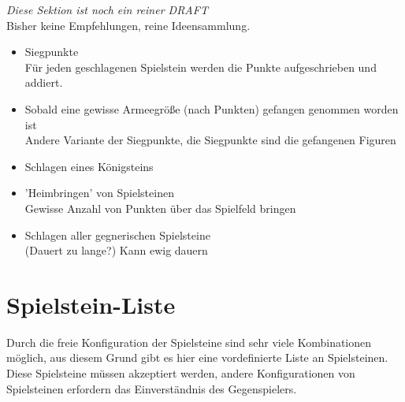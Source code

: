\documentclass{article}
\begin{document}
	\textit{Diese Sektion ist noch ein reiner DRAFT} \\
	Bisher keine Empfehlungen, reine Ideensammlung.
	
	\begin{itemize}
	\item Siegpunkte \\
		  Für jeden geschlagenen Spielstein werden die Punkte aufgeschrieben und addiert.

	
	\item Sobald eine gewisse Armeegröße (nach Punkten) gefangen genommen worden ist \\
		  Andere Variante der Siegpunkte, die Siegpunkte sind die gefangenen Figuren
	
	\item Schlagen eines Königsteins
	
	\item 'Heimbringen' von Spielsteinen \\
	       Gewisse Anzahl von Punkten über das Spielfeld bringen
	
	\item Schlagen aller gegnerischen Spielsteine \\
	      (Dauert zu lange?) Kann ewig dauern	
	\end{itemize}
	


\section{Spielstein-Liste}
	
	Durch die freie Konfiguration der Spielsteine sind sehr viele Kombinationen möglich, 
	aus diesem Grund gibt es hier eine vordefinierte Liste an Spielsteinen. Diese Spielsteine
	müssen akzeptiert werden, andere Konfigurationen von Spielsteinen erfordern das Einverständnis
	des Gegenspielers.
	
	
	
\end{document}
